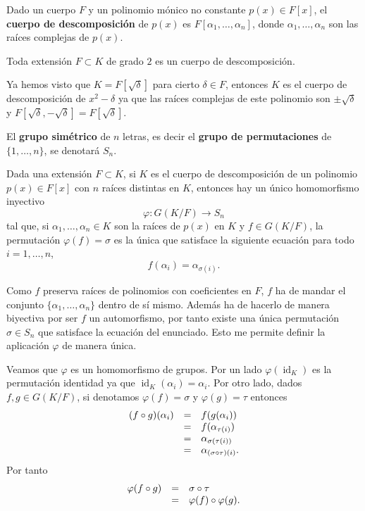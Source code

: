
Dado un cuerpo \(F\) y un polinomio mónico no constante
\(p(x)\in F[x]\), el \textbf{cuerpo de descomposición} de \(p(x)\) es
\(F[\alpha_1,\dots,\alpha_n]\), donde \(\alpha_1,\dots,\alpha_n\)
son las raíces complejas de \(p(x)\). 


Toda extensión \(F\subset K\) de grado \(2\) es un cuerpo de
descomposición. 


Ya hemos visto que \(K=F[\sqrt{\delta}]\) para cierto \(\delta\in F\),
entonces \(K\) es el cuerpo de descomposición de \(x^2-\delta\) ya que
las raíces complejas de este polinomio son \(\pm\sqrt{\delta}\) y
\(F[\sqrt{\delta},-\sqrt{\delta}]=F[\sqrt{\delta}]\). 

El \textbf{grupo simétrico} de \(n\) letras, es decir el \textbf{grupo
de permutaciones} de \(\{1,\dots,n\}\), se denotará \(S_n\).


Dada una extensión \(F\subset K\), si \(K\) es el cuerpo de
descomposición de un polinomio \(p(x)\in F[x]\) con \(n\) raíces
distintas en \(K\), entonces hay un único homomorfismo inyectivo
\[\varphi\colon G(K/F)\longrightarrow S_n\] tal que, si
\(\alpha_1,\dots,\alpha_n\in K\) son la raíces de \(p(x)\) en \(K\) y
\(f\in G(K/F)\), la permutación \(\varphi(f)=\sigma\) es la única que
satisface la siguiente ecuación para todo \(i=1,\dots,n\),
\[f(\alpha_i)=\alpha_{\sigma(i)}.\] 


Como \(f\) preserva raíces de polinomios con coeficientes en \(F\),
\(f\) ha de mandar el conjunto \(\{\alpha_1,\dots,\alpha_n\}\)
dentro de sí mismo. Además ha de hacerlo de manera biyectiva por ser
\(f\) un automorfismo, por tanto existe una única permutación
\(\sigma\in S_n\) que satisface la ecuación del enunciado. Esto me
permite definir la aplicación \(\varphi\) de manera única.

Veamos que \(\varphi\) es un homomorfismo de grupos. Por un lado
\(\varphi(\operatorname{id}_{K})\) es la permutación identidad ya que
\(\operatorname{id}_{K}(\alpha_i)=\alpha_i\). Por otro lado, dados
\(f,g\in G(K/F)\), si denotamos \(\varphi(f)=\sigma\) y
\(\varphi(g)=\tau\) entonces \[\begin{array}{rcl}
(f\circ g)(\alpha_i)&=&f(g(\alpha_i))\cr
&=&f(\alpha_{\tau(i)})\cr
&=&\alpha_{\sigma(\tau(i))}\cr
&=&\alpha_{(\sigma\circ\tau)(i)}.
\end{array}\] Por tanto \[\begin{array}{rcl}
\varphi(f\circ g)&=&\sigma\circ\tau\cr
&=&\varphi(f)\circ \varphi(g).
\end{array}\]

